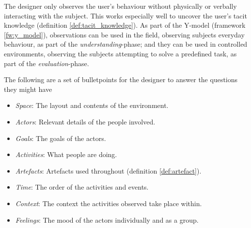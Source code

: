 \begin{method}[Observation] \label{meth:observation} 
  The designer only observes the user's behaviour without physically or verbally interacting with the subject. This works especially well to uncover the user's tacit knowledge (definition \ref{def:tacit_knowledge}). As part of the Y-model (framework \ref{fw:y_model}), observations can be used in the field, observing subjects everyday behaviour, as part of the \emph{understanding}-phase; and they can be used in controlled environments, observing the subjects attempting to solve a predefined task, as part of the \emph{evaluation}-phase. \cite[p.247-248]{rogers}

  The following are a set of bulletpoints for the designer to answer the questions they might have \cite[p.249]{rogers}
  \begin{itemize}
    \item \emph{Space}: The layout and contents of the environment.
    \item \emph{Actors}: Relevant details of the people involved.
    \item \emph{Goals}: The goals of the actors.
    \item \emph{Activities}: What people are doing.
    \item \emph{Artefacts}: Artefacts used throughout (definition \ref{def:artefact}).
    \item \emph{Time}: The order of the activities and events.
    \item \emph{Context}: The context the activities observed take place within.
    \item \emph{Feelings}: The mood of the actors individually and as a group.
  \end{itemize}
\end{method}